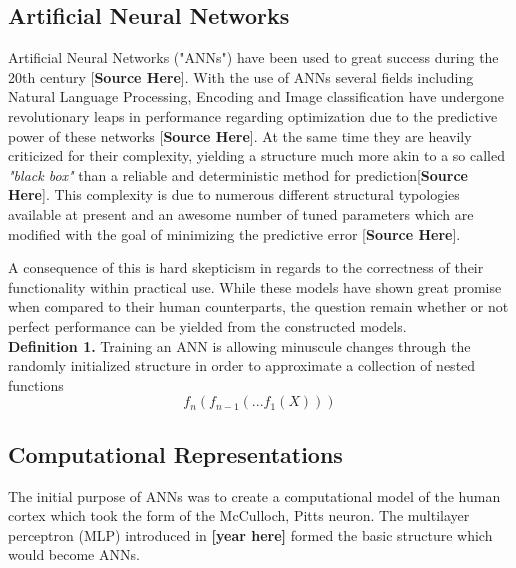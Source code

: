 \subsection{Artificial Neural Networks}
Artificial Neural Networks ("ANNs") have been used to great success during the 20th century [\textbf{Source Here}]. With the use of ANNs
several fields including Natural Language Processing, Encoding and Image classification have undergone revolutionary leaps in performance regarding optimization due to the predictive power of these networks [\textbf{Source Here}]. At the same time they are heavily criticized for their complexity, yielding a structure much more akin to a so called \textit{"black box"} than a reliable and deterministic method for prediction[\textbf{Source Here}]. This complexity is due to numerous different structural typologies available at present and an awesome number of tuned parameters which are modified with the goal of minimizing the predictive error [\textbf{Source Here}].

A consequence of this is hard skepticism in regards to the correctness of their functionality within practical use. While these models have shown great promise when compared to their human counterparts, the question remain whether or not perfect performance can be yielded from the constructed models.\\

\textbf{Definition 1.} Training an ANN is allowing minuscule changes through the randomly initialized structure in order to approximate a collection of nested functions $$f_n(f_{n-1}(...f_1(X)))$$ 

\subsection{Computational Representations}
The initial purpose of ANNs was to create a computational model of the human cortex which took the form of the McCulloch, Pitts neuron. The multilayer perceptron (MLP) introduced in \textbf{[year here]} formed the basic structure which would become ANNs. 


